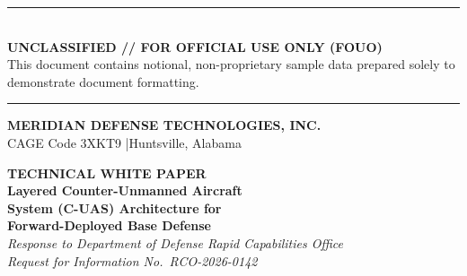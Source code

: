 \documentclass[11pt,letterpaper]{article}
\begin{document}
\thispagestyle{fancy}

\begin{center}
{\color{accent2}\rule{\linewidth}{1.4pt}}\\[2pt]
{\footnotesize\bfseries\color{accent2}UNCLASSIFIED // FOR OFFICIAL USE ONLY (FOUO)}\\[1pt]
{\tiny\color{midgray}This document contains notional, non-proprietary sample data prepared solely to demonstrate document formatting.}\\[2pt]
{\color{accent2}\rule{\linewidth}{1.4pt}}
\end{center}

\vspace{18pt}
\begin{center}
{\Large\bfseries\color{accent} MERIDIAN DEFENSE TECHNOLOGIES, INC.}\\[4pt]
{\footnotesize\color{midgray} CAGE Code 3XKT9 \quad|\quad Huntsville, Alabama}
\end{center}

\vspace{22pt}
\begin{center}
{\footnotesize\bfseries\color{midgray} TECHNICAL WHITE PAPER}\\[10pt]
{\huge\bfseries\color{accent} Layered Counter-Unmanned Aircraft\\ System (C-UAS) Architecture for\\ Forward-Deployed Base Defense}\\[14pt]
{\normalsize\itshape\color{midgray} Response to Department of Defense Rapid Capabilities Office\\ Request for Information No.\ RCO-2026-0142}
\end{center}

\vspace{20pt}
\begin{center}
\end{center}
\end{document}
